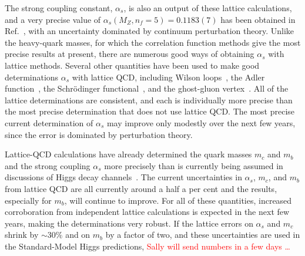 \begin{itemize}
The strong coupling constant, $\alpha_s$, is also an output of these lattice
calculations, and a very precise value of $\alpha_s(M_Z, n_f=5) = 0.1183(7)$
has been obtained in Ref.~\cite{McNeile:2010ji}, with an uncertainty dominated
by continuum perturbation theory.  Unlike the heavy-quark masses, for which
the correlation function methods give the most precise results at present,
there are numerous good ways of obtaining $\alpha_s$ with lattice methods.
Several other quantities have been used to make good determinations $\alpha_s$
with lattice QCD, including Wilson loops~\cite{McNeile:2010ji}, the Adler
function~\cite{Shintani:2010ph}, the Schr{\"o}dinger
functional~\cite{Aoki:2009tf}, and the ghost-gluon
vertex~\cite{Blossier:2012ef}.  All of the lattice determinations are
consistent, and each is individually more precise than the most precise
determination that does not use lattice QCD.  The most precise current
determination of $\alpha_s$ may improve only modestly over the next few years,
since the error is dominated by perturbation theory.

Lattice-QCD calculations have already determined the quark masses $m_c$ and
$m_b$ and the strong coupling $\alpha_s$ more precisely than is currently
being assumed in discussions of Higgs decay channels~\cite{Denner:2011mq}.
The current uncertainties in $\alpha_s$, $m_c$, and $m_b$ from lattice QCD are
all currently around a half a per cent and the results, especially for $m_b$,
will continue to improve.  For all of these quantities, increased
corroboration from independent lattice calculations is expected in the next
few years, making the determinations very robust.  If the lattice errors on
$\alpha_s$ and $m_c$ shrink by $\sim 30\%$ and on $m_b$ by a factor of two,
and these uncertainties are used in the Standard-Model Higgs predictions,
\textcolor{red}{Sally will send numbers in a few days \ldots}


\end{itemize}
